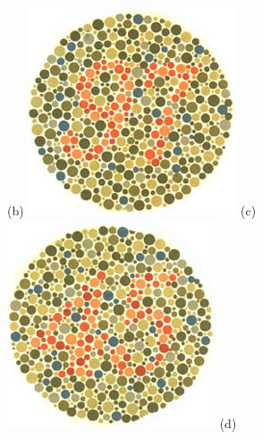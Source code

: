 \documentclass[	12pt, Times, openright, twoside, a4paper, english, brazil]{abntex2}
\begin{document}
\begin{apendicesenv}
\begin{figure}[!htb]
(b)
\endminipage\hfill
{}
\centering
{\includegraphics[width=\linewidth]{ishihara-fuga/plate12.jpg}}
(c)
\endminipage\hfill
{}
\centering
{\includegraphics[width=\linewidth]{ishihara-fuga/plate13.jpg}}
(d)
\endminipage\hfill


\end{figure}
\end{apendicesenv}
\end{document}
